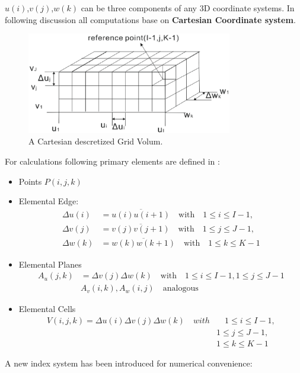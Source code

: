 $u(i)$,$v(j)$,$w(k)$ can be three components of any 3D coordinate systems. In following discussion all computations base on \textbf{Cartesian Coordinate system}.\\
\begin{figure}[!ht]
\centering
\includegraphics[width=0.8\textwidth]{bilder/grid_volum}
\caption{A Cartesian descretized Grid Volum\cite{script_FeldSim}.}
\label{fig:discretization_material}
\end{figure}
For calculations following primary elements are defined in \cite{script_FeldSim}:
\begin{itemize}
\item Points $P(i,j,k)$
\item Elemental Edge:
    \begin{align*}
		\Delta u(i)&=\overline{u(i)u(i+1)}  \quad \mathrm{with}  \quad 1\leq i \leq I-1, \nonumber\\
		\Delta v(j)&=\overline{v(j)v(j+1)}  \quad \mathrm{with}  \quad 1\leq j \leq J-1, \nonumber\\
		\Delta w(k)&=\overline{w(k)w(k+1)}  \quad \mathrm{with}  \quad 1\leq k \leq K-1
		\end{align*}
\item Elemental Planes
		\begin{align*}
		A_{u}(j,k)&=\Delta v(j)\Delta w(k) \quad \mathrm{with}  \quad 1\leq i \leq I-1,1\leq j \leq J-1\nonumber\\
		&A_{v}(i,k),A_{w}(i,j)  \quad \mathrm{analogous}
		\end{align*}
\item Elemental Cells
		\begin{align*}
		V(i,j,k)=\Delta u(i)\Delta v(j)\Delta w(k)  \quad with  &\quad 1\leq i\leq I-1,\nonumber\\
		&1\leq j\leq J-1,\nonumber\\
		&1\leq k\leq K-1
		\end{align*}
\end{itemize}
A new index system has been introduced for numerical convenience:

